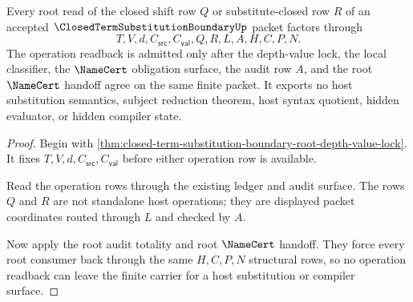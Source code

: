 \begin{theorem}
\label{thm:closed-term-substitution-boundary-root-operation-readback-lock}
Every root read of the closed shift row $Q$ or substitute-closed row $R$ of an accepted $\ClosedTermSubstitutionBoundaryUp$ packet factors through
$$
T,V,d,C_{\mathsf{src}},C_{\mathsf{val}},Q,R,L,A,H,C,P,N.
$$
The operation readback is admitted only after the depth-value lock, the local classifier, the $\NameCert$ obligation surface, the audit row $A$, and the root $\NameCert$ handoff agree on the same finite packet. It exports no host substitution semantics, subject reduction theorem, host syntax quotient, hidden evaluator, or hidden compiler state.
\end{theorem}
\begin{proof}
Begin with \autoref{thm:closed-term-substitution-boundary-root-depth-value-lock}. It fixes $T,V,d,C_{\mathsf{src}},C_{\mathsf{val}}$ before either operation row is available.

Read the operation rows through the existing ledger and audit surface. The rows $Q$ and $R$ are not standalone host operations; they are displayed packet coordinates routed through $L$ and checked by $A$.

Now apply the root audit totality and root $\NameCert$ handoff. They force every root consumer back through the same $H,C,P,N$ structural rows, so no operation readback can leave the finite carrier for a host substitution or compiler surface.
\end{proof}

